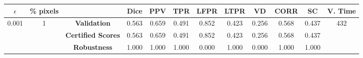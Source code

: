 \begin{longtable}{ c  c | c | c  c  c  c  c  c  c c c}
\toprule \textbf{$\epsilon$} & \textbf{\% pixels} & & \textbf{Dice} & \textbf{PPV} & \textbf{TPR} & \textbf{LFPR} & \textbf{LTPR} & \textbf{VD} & \textbf{CORR} & \textbf{SC} & \textbf{V. Time} \\
\midrule 
\multirow{3}{*}{0.001}  & \multirow{3}{*}{1} &\textbf{Validation} & 0.563 & 0.659 & 0.491 & 0.852 & 0.423 & 0.256 & 0.568 & 0.437 & \multirow{3}{*}{432} \\
 & & \textbf{Certified Scores} & 0.563 & 0.659 & 0.491 & 0.852 & 0.423 & 0.256 & 0.568 & 0.437 & \\
& & \textbf{Robustness} & 1.000 & 1.000 & 1.000 & 0.000 & 1.000 & 0.000 & 1.000 & 1.000 & \\
\end{longtable}